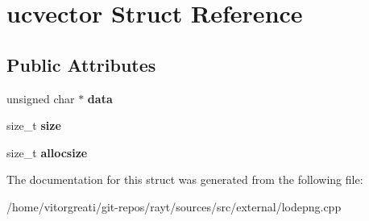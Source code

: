 \hypertarget{structucvector}{}\section{ucvector Struct Reference}
\label{structucvector}
\subsection*{Public Attributes}
\begin{DoxyCompactItemize}
\item 
\mbox{\label{structucvector_ace794c5713208c5a20f21762cd87c919}} 
unsigned char $\ast$ {\bfseries data}
\item 
\mbox{\label{structucvector_a27c99c34de0c5b3ca0c242d402c69499}} 
size\+\_\+t {\bfseries size}
\item 
\mbox{\label{structucvector_a235168baac13f0c78bd3e309dc170f90}} 
size\+\_\+t {\bfseries allocsize}
\end{DoxyCompactItemize}


The documentation for this struct was generated from the following file\+:\begin{DoxyCompactItemize}
\item 
/home/vitorgreati/git-\/repos/rayt/sources/src/external/lodepng.\+cpp\end{DoxyCompactItemize}
